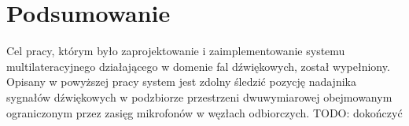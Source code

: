 \chapter*{Podsumowanie}\label{chap:podsumowanie}

Cel pracy, którym było zaprojektowanie i zaimplementowanie systemu multilateracyjnego działającego w domenie fal dźwiękowych, został wypełniony. Opisany w powyższej pracy system jest zdolny śledzić pozycję nadajnika sygnałów dźwiękowych w podzbiorze przestrzeni dwuwymiarowej obejmowanym ograniczonym przez zasięg mikrofonów w węzłach odbiorczych. TODO: dokończyć